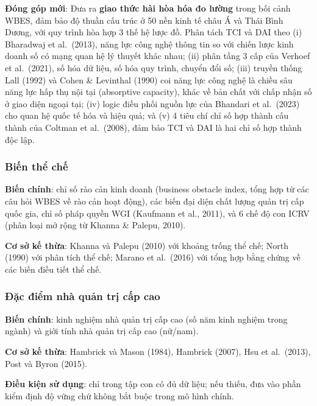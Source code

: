 \documentclass[
  a4paper,
  13pt]{extreport}
\begin{document}
\textbf{Đóng góp mới}: Đưa ra \textbf{giao thức hài hòa hóa đo lường}
trong bối cảnh WBES, đảm bảo độ thuần cấu trúc ở 50 nền kinh tế châu Á
và Thái Bình Dương, với quy trình hòa hợp 3 thế hệ lược đồ. Phân tách
TCI và DAI theo (i) Bharadwaj et al.~(2013), năng lực công nghệ thông
tin so với chiến lược kinh doanh số có mạng quan hệ lý thuyết khác nhau;
(ii) phân tầng 3 cấp của Verhoef et al.~(2021), số hóa dữ liệu, số hóa
quy trình, chuyển đổi số; (iii) truyền thống Lall (1992) và Cohen \&
Levinthal (1990) coi năng lực công nghệ là chiều sâu năng lực hấp thụ
nội tại (absorptive capacity), khác về bản chất với chấp nhận số ở giao
diện ngoại tại; (iv) logic điều phối nguồn lực của Bhandari et
al.~(2023) cho quan hệ quốc tế hóa và hiệu quả; và (v) 4 tiêu chí chỉ số
hợp thành cấu thành của Coltman et al.~(2008), đảm bảo TCI và DAI là hai
chỉ số hợp thành độc lập.

\hypertarget{biux1ebfn-thux1ec3-chux1ebf}{%
\subsubsection{Biến thể chế}\label{biux1ebfn-thux1ec3-chux1ebf}}

\textbf{Biến chính}: chỉ số rào cản kinh doanh (business obstacle index,
tổng hợp từ các câu hỏi WBES về rào cản hoạt động), các biến đại diện
chất lượng quản trị cấp quốc gia, chỉ số pháp quyền WGI (Kaufmann et
al., 2011), và 6 chế độ con ICRV (phân loại mở rộng từ Khanna \& Palepu,
2010).

\textbf{Cơ sở kế thừa}: Khanna và Palepu (2010) với khoảng trống thể
chế; North (1990) với phân tích thể chế; Marano et al.~(2016) với tổng
hợp bằng chứng về các biến điều tiết thể chế.

\hypertarget{ux111ux1eb7c-ux111iux1ec3m-nhuxe0-quux1ea3n-trux1ecb-cux1ea5p-cao}{%
\subsubsection{Đặc điểm nhà quản trị cấp
cao}\label{ux111ux1eb7c-ux111iux1ec3m-nhuxe0-quux1ea3n-trux1ecb-cux1ea5p-cao}}

\textbf{Biến chính}: kinh nghiệm nhà quản trị cấp cao (số năm kinh
nghiệm trong ngành) và giới tính nhà quản trị cấp cao (nữ/nam).

\textbf{Cơ sở kế thừa}: Hambrick và Mason (1984), Hambrick (2007), Hsu
et al.~(2013), Post và Byron (2015).

\textbf{Điều kiện sử dụng}: chỉ trong tập con có đủ dữ liệu; nếu thiếu,
đưa vào phần kiểm định độ vững chứ không bắt buộc trong mô hình chính.
\end{document}
